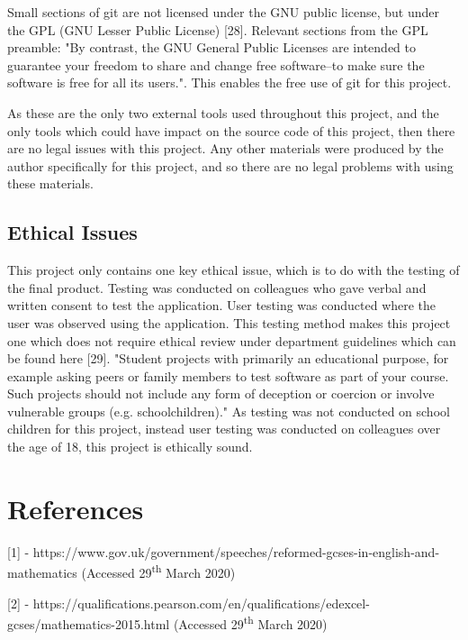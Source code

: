 \documentclass{article}
\begin{document}
Small sections of git are not licensed under the GNU public license, but under the GPL (GNU Lesser Public License) [28]. Relevant sections from the GPL preamble: "By contrast, the GNU General Public Licenses are intended to guarantee your freedom to share and change free software--to make sure the software is free for all its users.". This enables the free use of git for this project. \par

As these are the only two external tools used throughout this project, and the only tools which could have impact on the source code of this project, then there are no legal issues with this project. Any other materials were produced by the author specifically for this project, and so there are no legal problems with using these materials. \par

\subsection{Ethical Issues}

This project only contains one key ethical issue, which is to do with the testing of the final product. Testing was conducted on colleagues who gave verbal and written consent to test the application. User testing was conducted where the user was observed using the application. This testing method makes this project one which does not require ethical review under department guidelines which can be found here [29]. "Student projects with primarily an educational purpose, for example asking peers or family members to test software as part of your course. Such projects should not include any form of deception or coercion or involve vulnerable groups (e.g. schoolchildren)." As testing was not conducted on school children for this project, instead user testing was conducted on colleagues over the age of 18, this project is ethically sound. 

\section{References}
\label{section:references}

[1] - https://www.gov.uk/government/speeches/reformed-gcses-in-english-and-mathematics (Accessed 29\textsuperscript{th} March 2020) \par

[2] - https://qualifications.pearson.com/en/qualifications/edexcel-gcses/mathematics-2015.html (Accessed 29\textsuperscript{th} March 2020) \par
\end{document}
